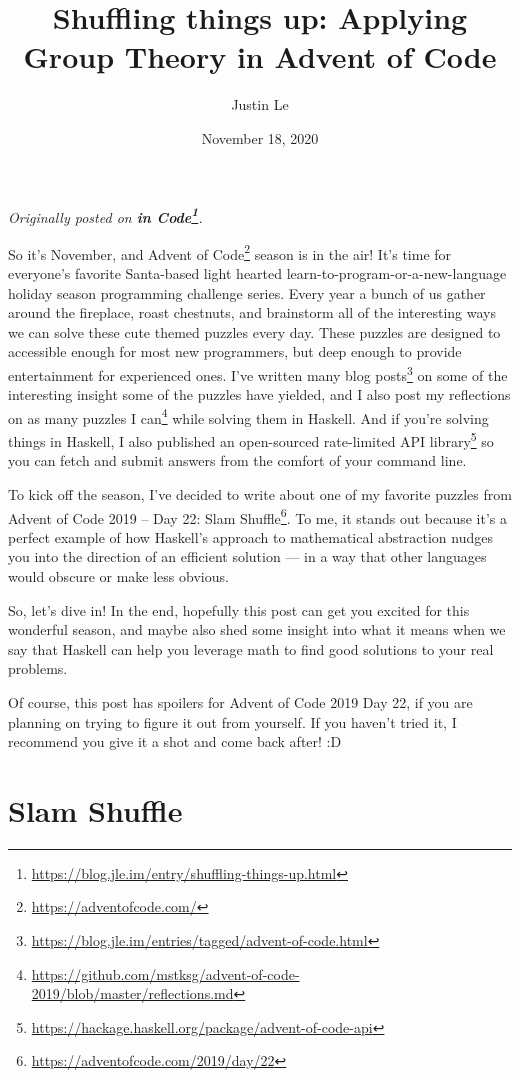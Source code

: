 \documentclass[]{article}
\title{Shuffling things up: Applying Group Theory in Advent of Code}
\author{Justin Le}
\date{November 18, 2020}
\renewcommand{\href}[2]{#2\footnote{\url{#1}}}
\begin{document}
\maketitle

\emph{Originally posted on
\textbf{\href{https://blog.jle.im/entry/shuffling-things-up.html}{in Code}}.}

So it's November, and \href{https://adventofcode.com/}{Advent of Code} season is
in the air! It's time for everyone's favorite Santa-based light hearted
learn-to-program-or-a-new-language holiday season programming challenge series.
Every year a bunch of us gather around the fireplace, roast chestnuts, and
brainstorm all of the interesting ways we can solve these cute themed puzzles
every day. These puzzles are designed to accessible enough for most new
programmers, but deep enough to provide entertainment for experienced ones. I've
\href{https://blog.jle.im/entries/tagged/advent-of-code.html}{written many blog
posts} on some of the interesting insight some of the puzzles have yielded, and
I also
\href{https://github.com/mstksg/advent-of-code-2019/blob/master/reflections.md}{post
my reflections on as many puzzles I can} while solving them in Haskell. And if
you're solving things in Haskell, I also published an
\href{https://hackage.haskell.org/package/advent-of-code-api}{open-sourced
rate-limited API library} so you can fetch and submit answers from the comfort
of your command line.

To kick off the season, I've decided to write about one of my favorite puzzles
from Advent of Code 2019 -- \href{https://adventofcode.com/2019/day/22}{Day 22:
Slam Shuffle}. To me, it stands out because it's a perfect example of how
Haskell's approach to mathematical abstraction nudges you into the direction of
an efficient solution --- in a way that other languages would obscure or make
less obvious.

So, let's dive in! In the end, hopefully this post can get you excited for this
wonderful season, and maybe also shed some insight into what it means when we
say that Haskell can help you leverage math to find good solutions to your real
problems.

Of course, this post has spoilers for Advent of Code 2019 Day 22, if you are
planning on trying to figure it out from yourself. If you haven't tried it, I
recommend you give it a shot and come back after! :D

\hypertarget{slam-shuffle}{%
\section{Slam Shuffle}\label{slam-shuffle}}
\end{document}
